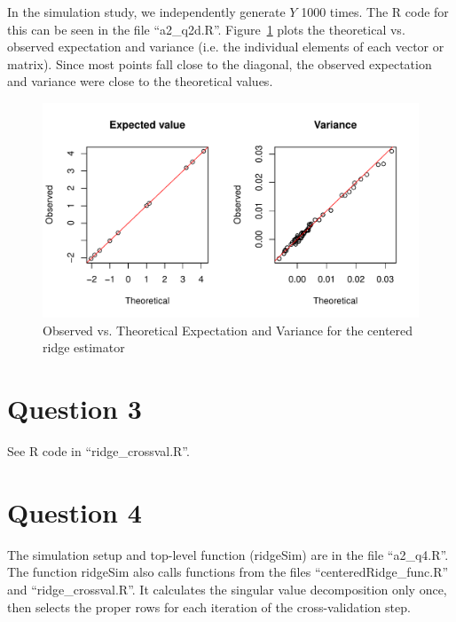 \documentclass{article}\usepackage[]{graphicx}\usepackage[]{color}
\makeatletter
\def\maxwidth{ %
  \ifdim\Gin@nat@width>\linewidth
    \linewidth
  \else
    \Gin@nat@width
  \fi
}
\newenvironment{knitrout}{}{} %
\makeatother
\begin{document}
\vspace{0.5in}

In the simulation study, we independently generate $Y$ 1000 times.  The R code for this can be seen in the file ``a2\_q2d.R''. Figure~\ref{fig:q2_graphs} plots the theoretical vs. observed expectation and variance (i.e. the individual elements of each vector or matrix).  Since most points fall close to the diagonal, the observed expectation and variance were close to the theoretical values.


\begin{knitrout}
\color{fgcolor}\begin{figure}
\includegraphics[width=\maxwidth]{figure/q2_graphs-1} \caption[Observed vs]{Observed vs. Theoretical Expectation and Variance for the centered ridge estimator}\label{fig:q2_graphs}
\end{figure}


\end{knitrout}


\section*{Question 3}
See R code in ``ridge\_crossval.R''.

\section*{Question 4}
The simulation setup and top-level function (ridgeSim) are in the file ``a2\_q4.R''.  The function ridgeSim also calls functions from the files ``centeredRidge\_func.R'' and ``ridge\_crossval.R''.  It calculates the singular value decomposition only once, then selects the proper rows for each iteration of the cross-validation step. 
\end{document}
